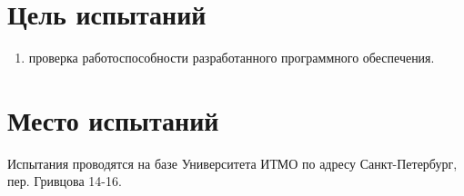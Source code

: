 \section{Цель испытаний}

\begin{enumerate}
    \item проверка работоспособности разработанного программного обеспечения.

\end{enumerate}


\section{Место испытаний}

Испытания проводятся на базе Университета ИТМО по адресу Санкт-Петербург, пер. Гривцова 14-16.
